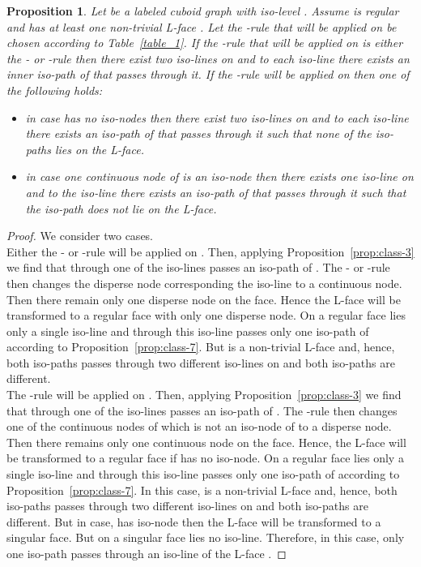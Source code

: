 \documentclass[a4paper,11pt]{article}
\newtheorem{proposition}[theorem]{Proposition}
\begin{document}
\vspace{0.2cm}

\begin{proposition}
Let  be a labeled cuboid graph with iso-level . Assume  is regular and
has at least one non-trivial L-face . Let the -rule that will be applied on 
be chosen according to Table~\ref{table_1}. If the -rule that will be applied on  is either the
- or -rule then there exist two iso-lines on  and to each iso-line there exists an inner
iso-path of  that passes through it. If the -rule will be applied on  then one of the following
holds:
\begin{itemize}
\item[(a)] in case  has no iso-nodes then there exist two iso-lines on  and to each iso-line there
exists an iso-path of  that passes through it such that none of the iso-paths lies on the L-face.
\item[(b)] in case one continuous node of  is an iso-node then there exists one iso-line on  and to the
iso-line there exists an iso-path of  that passes through it such that the iso-path does not lie on the
L-face.
\end{itemize}
\label{prop:class-8}
\end{proposition}
\begin{proof} We consider two cases. \\

Either the - or -rule will be applied on . Then, applying
Proposition~\ref{prop:class-3} we find that through one of the iso-lines passes an iso-path of .
The - or -rule then changes the disperse node corresponding the iso-line to a continuous node.
Then there remain only one disperse node on the face. Hence the L-face will be transformed to a regular face
with only one disperse node. On a regular face lies only a single iso-line and through this iso-line
passes only one iso-path of  according to Proposition~\ref{prop:class-7}. But  is a non-trivial L-face
and, hence, both iso-paths passes through two different iso-lines on  and both iso-paths are different.\\

The -rule will be applied on . Then, applying Proposition~\ref{prop:class-3}
we find that through one of the iso-lines passes an iso-path of . The -rule then changes one of the
continuous nodes of  which is not an iso-node of  to a disperse node. Then there remains only one
continuous node on the face. Hence, the L-face will be transformed to a regular face if  has no
iso-node. On a regular face lies only a single iso-line and through this iso-line passes only one iso-path
of  according to Proposition~\ref{prop:class-7}. In this case,  is a non-trivial L-face
and, hence, both iso-paths passes through two different iso-lines on  and both iso-paths are different.
But in case,  has iso-node then the L-face will be transformed to a singular face. But on a singular
face lies no iso-line. Therefore, in this case, only one iso-path passes through an iso-line of the L-face .
\end{proof}
\end{document}
